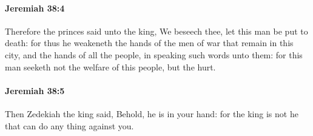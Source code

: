 		\paragraph{Jeremiah 38:4} %
			\label{JEREMIAH-38-4}

			Therefore the princes said unto the king, We beseech thee, let this man be put to death: for thus he weakeneth the hands of the men of war that remain in this city, and the hands of all the people, in speaking such words unto them: for this man seeketh not the welfare of this people, but the hurt.


		\paragraph{Jeremiah 38:5} %
			\label{JEREMIAH-38-5}

			Then Zedekiah the king said, Behold, he is in your hand: for the king is not he that can do any thing against you.

